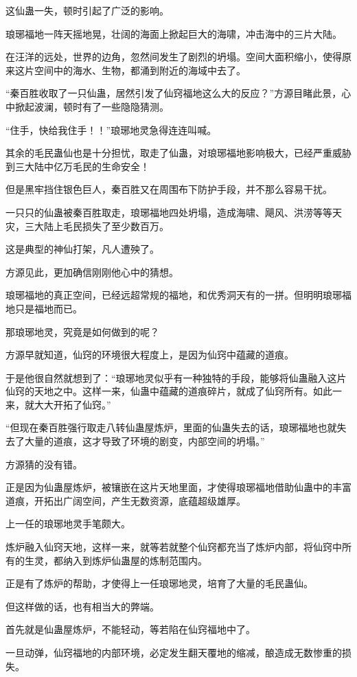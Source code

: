 \begin{this_body}
这仙蛊一失，顿时引起了广泛的影响。

琅琊福地一阵天摇地晃，壮阔的海面上掀起巨大的海啸，冲击海中的三片大陆。

在汪洋的远处，世界的边角，忽然间发生了剧烈的坍塌。空间大面积缩小，使得原来这片空间中的海水、生物，都涌到附近的海域中去了。

“秦百胜收取了一只仙蛊，居然引发了仙窍福地这么大的反应？”方源目睹此景，心中掀起波澜，顿时有了一些隐隐猜测。

“住手，快给我住手！！”琅琊地灵急得连连叫喊。

其余的毛民蛊仙也是十分担忧，取走了仙蛊，对琅琊福地影响极大，已经严重威胁到三大陆中亿万毛民的生命安全！

但是黑牢挡住银色巨人，秦百胜又在周围布下防护手段，并不那么容易干扰。

一只只的仙蛊被秦百胜取走，琅琊福地四处坍塌，造成海啸、飓风、洪涝等等天灾，三大陆上毛民损失了至少数百万。

这是典型的神仙打架，凡人遭殃了。

方源见此，更加确信刚刚他心中的猜想。

琅琊福地的真正空间，已经远超常规的福地，和优秀洞天有的一拼。但明明琅琊福地只是福地而已。

那琅琊地灵，究竟是如何做到的呢？

方源早就知道，仙窍的环境很大程度上，是因为仙窍中蕴藏的道痕。

于是他很自然就想到了：“琅琊地灵似乎有一种独特的手段，能够将仙蛊融入这片仙窍的天地之中。这样一来，仙蛊中蕴藏的道痕碎片，就成了仙窍所有。如此一来，就大大开拓了仙窍。”

“但现在秦百胜强行取走八转仙蛊屋炼炉，里面的仙蛊失去的话，琅琊福地也就失去了大量的道痕，这才导致了环境的剧变，内部空间的坍塌。”

方源猜的没有错。

正是因为仙蛊屋炼炉，被镶嵌在这片天地里面，才使得琅琊福地借助仙蛊中的丰富道痕，开拓出广阔空间，产生无数资源，底蕴超级雄厚。

上一任的琅琊地灵手笔颇大。

炼炉融入仙窍天地，这样一来，就等若就整个仙窍都充当了炼炉内部，将仙窍中所有的生灵，都纳入到炼炉仙蛊屋的炼制范围内。

正是有了炼炉的帮助，才使得上一任琅琊地灵，培育了大量的毛民蛊仙。

但这样做的话，也有相当大的弊端。

首先就是仙蛊屋炼炉，不能轻动，等若陷在仙窍福地中了。

一旦动弹，仙窍福地的内部环境，必定发生翻天覆地的缩减，酿造成无数惨重的损失。


\end{this_body}
